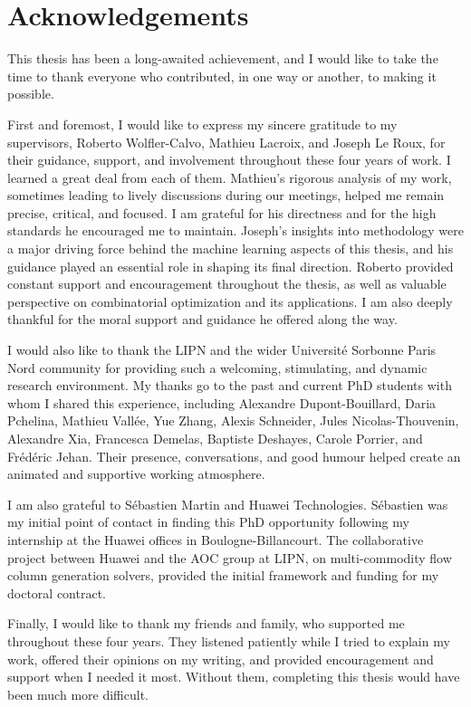 \chapter*{Acknowledgements}
    
This thesis has been a long-awaited achievement, and I would like to take the time to thank everyone who contributed, in one way or another, to making it possible.

First and foremost, I would like to express my sincere gratitude to my supervisors, Roberto Wolfler-Calvo, Mathieu Lacroix, and Joseph Le Roux, for their guidance, support, and involvement throughout these four years of work. I learned a great deal from each of them. Mathieu’s rigorous analysis of my work, sometimes leading to lively discussions during our meetings, helped me remain precise, critical, and focused. I am grateful for his directness and for the high standards he encouraged me to maintain. Joseph’s insights into methodology were a major driving force behind the machine learning aspects of this thesis, and his guidance played an essential role in shaping its final direction. Roberto provided constant support and encouragement throughout the thesis, as well as valuable perspective on combinatorial optimization and its applications. I am also deeply thankful for the moral support and guidance he offered along the way.

I would also like to thank the LIPN and the wider Université Sorbonne Paris Nord community for providing such a welcoming, stimulating, and dynamic research environment. My thanks go to the past and current PhD students with whom I shared this experience, including Alexandre Dupont-Bouillard, Daria Pchelina, Mathieu Vallée, Yue Zhang, Alexis Schneider, Jules Nicolas-Thouvenin, Alexandre Xia, Francesca Demelas, Baptiste Deshayes, Carole Porrier, and Frédéric Jehan. Their presence, conversations, and good humour helped create an animated and supportive working atmosphere.

I am also grateful to Sébastien Martin and Huawei Technologies. Sébastien was my initial point of contact in finding this PhD opportunity following my internship at the Huawei offices in Boulogne-Billancourt. The collaborative project between Huawei and the AOC group at LIPN, on multi-commodity flow column generation solvers, provided the initial framework and funding for my doctoral contract.

Finally, I would like to thank my friends and family, who supported me throughout these four years. They listened patiently while I tried to explain my work, offered their opinions on my writing, and provided encouragement and support when I needed it most. Without them, completing this thesis would have been much more difficult.

\thesisclearpage